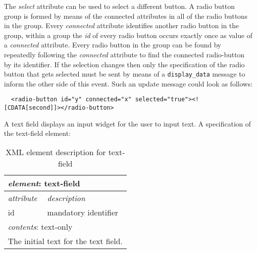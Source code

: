 \documentclass{article}
\newcommand{\msg}[1]{\texttt{#1}}
\begin{document}
   \noindent The \textit{select} attribute can be used to select a different button. A
   radio button group is formed by means of the connected attributes in all of
   the radio buttons in the group. Every \textit{connected} attribute
   identifies another radio button in the group, within a group the \textit{id}
   of every radio button occurs exactly once as value of a \textit{connected}
   attribute.  Every radio button in the group can be found by repeatedly
   following the \textit{connected} attribute to find the connected
   radio-button by its identifier. If the selection changes then only the
   specification of the radio button that gets selected must be sent by means
   of a \msg{display\_data} message to inform the other side of this event.
   Such an update message could look as follows:

    \small \begin{verbatim}
  <radio-button id="y" connected="x" selected="true"><![CDATA[second]]></radio-button>\end{verbatim}
  \normalsize

   \noindent A text field displays an input widget for the user to input text.
   A specification of the text-field element:

    \begin{table}[H]
     \begin{center}
     \begin{tabular}{|l|l|}
       \hline
        \multicolumn{2}{|l|}{\textit{element}: text-field} \\
       \hline \hline
        \textit{attribute} & \textit{description} \\
       \hline
        id                 & mandatory identifier \\
       \hline \hline
        \multicolumn{2}{|l|}{\textit{contents}: text-only} \\
       \hline
         \multicolumn{2}{|l|}{The initial text for the text field.} \\
       \hline
     \end{tabular}
     \end{center}
     \label{figure:element_text_field}
     \caption{XML element description for text-field}
    \end{table}

\end{document}
